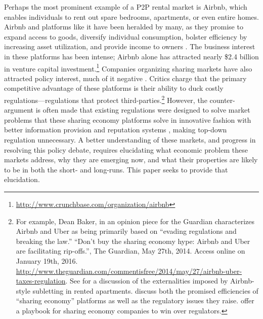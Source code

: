 \documentclass[11pt]{article}
\begin{document}
Perhaps the most prominent example of a P2P rental market is Airbnb, which enables individuals to rent out spare bedrooms, apartments, or even entire homes. 
Airbnb and platforms like it have been heralded by many, as they promise to expand access to goods, diversify individual consumption, bolster efficiency by increasing asset utilization, and provide income to owners \citep{sundararajan2013zipcar, edelman2015efficiencies, botsman2010s}.
The business interest in these platforms has been intense; Airbnb alone has attracted nearly \$2.4 billion in venture capital investment.\footnote{\href{http://www.crunchbase.com/organization/airbnb}{http://www.crunchbase.com/organization/airbnb}}
Companies organizing sharing markets have also attracted policy interest, much of it negative \citep{slee2015, malhotra2014dark, avital2015}. 
Critics charge that the primary competitive advantage of these platforms is their ability to duck costly regulations---regulations that protect third-parties.\footnote{
  For example, Dean Baker, in an opinion piece for the Guardian characterizes Airbnb and Uber as being primarily based on ``evading regulations and breaking the law.''
  ``Don't buy the sharing economy hype: Airbnb and Uber are facilitating rip-offs.'', The Guardian, May 27th, 2014. Access online on January 19th, 2016.
  \url{http://www.theguardian.com/commentisfree/2014/may/27/airbnb-uber-taxes-regulation}. 
  See \cite{horton2014tragedy} for a discussion of the externalities imposed by Airbnb-style subletting in rented apartments.
  \cite{edelman2015efficiencies} discuss both the promised efficiencies of ``sharing economy'' platforms as well as the regulatory issues they raise.
  \cite{cannon2014uber} offer a playbook for sharing economy companies to win over regulators.
}   
However, the counter-argument is often made that existing regulations were designed to solve market problems that these sharing economy platforms solve in innovative fashion with better information provision and reputation systems \citep{koopman2014sharing}, making top-down regulation unnecessary.  
A better understanding of these markets, and progress in resolving this policy debate, requires elucidating what economic problem these markets address, why they are emerging now, and what their properties are likely to be in both the short- and long-runs. 
This paper seeks to provide that elucidation. 
\end{document}
